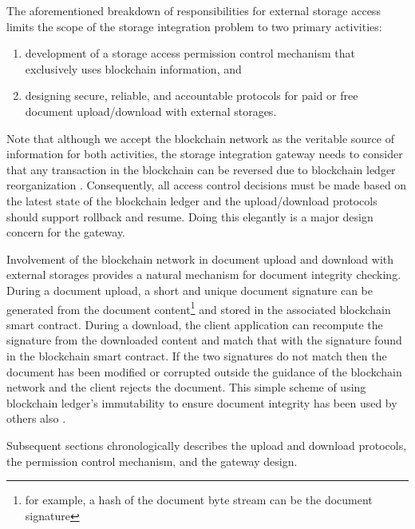 The aforementioned breakdown of responsibilities for external storage access limits the scope of the storage integration problem to two primary activities: 

\begin{enumerate}
\item development of a storage access permission control mechanism that exclusively uses blockchain information, and
\item designing secure, reliable, and accountable protocols for paid or free document upload/download with external storages. 
\end{enumerate}          

Note that although we accept the blockchain network as the veritable source of information for both activities, the storage integration gateway needs to consider that any transaction in the blockchain can be reversed due to blockchain ledger reorganization \cite{reorg}. Consequently, all access control decisions must be made based on the latest state of the blockchain ledger and the upload/download protocols should support rollback and resume. Doing this elegantly is a major design concern for the gateway.

Involvement of the blockchain network in document upload and download with external storages provides a natural mechanism for document integrity checking. During a document upload, a short and unique document signature can be generated from the document content\footnote{for example, a hash of the document byte stream can be the document signature} and stored in the associated blockchain smart contract. During a download, the client application can recompute the signature from the downloaded content and match that with the signature found in the blockchain smart contract. If the two signatures do not match then the document has been modified or corrupted outside the guidance of the blockchain network and the client rejects the document. This simple scheme of using blockchain ledger's immutability to ensure document integrity has been used by others also \cite{stampIO}.  

Subsequent sections chronologically describes the upload and download protocols, the permission control mechanism, and the gateway design.
